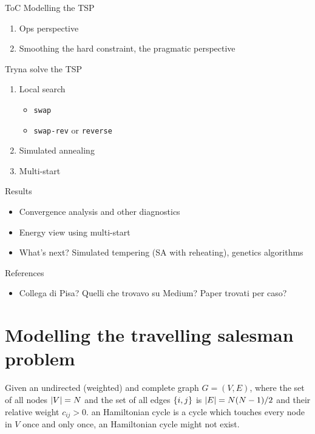 
ToC
Modelling the TSP
\begin{enumerate}
	\item Ops perspective
	\item Smoothing the hard constraint, the pragmatic perspective
\end{enumerate}
Tryna solve the TSP
\begin{enumerate}
	\item Local search
	\begin{itemize}
		\item \texttt{swap}
		\item \texttt{swap-rev} or \texttt{reverse}
	\end{itemize}
	\item Simulated annealing
	\item Multi-start
\end{enumerate}
Results
\begin{itemize}
	\item Convergence analysis and other diagnostics
	\item Energy view using multi-start
	\item What's next? Simulated tempering (SA with reheating), genetics algorithms
\end{itemize}
References
\begin{itemize}
	\item Collega di Pisa? Quelli che trovavo su Medium? Paper trovati per caso?
\end{itemize}

\section{Modelling the travelling salesman problem}\label{sc:tsp}

Given an undirected (weighted) and complete graph $G=(V,E)$, where the set of all nodes $\lvert V\rvert=N$ and the set of all edges $\{i,j\}$ is $\lvert E\rvert=N(N-1)/2$ and their relative weight $c_{ij}>0$. an Hamiltonian cycle is a cycle which touches every node in $V$ once and only once, an Hamiltonian cycle might not exist.

